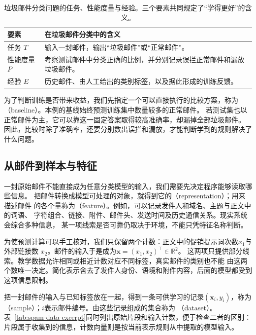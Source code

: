 \begin{table}[htbp]
  \centering
  \small
  \begin{tabularx}{\linewidth}{@{}lX@{}}
    \toprule
    \textbf{要素} & \textbf{在垃圾邮件分类中的含义} \\
    \midrule
    任务 $T$ & 输入一封邮件，输出“垃圾邮件”或“正常邮件”。 \\
    性能度量 $P$ & 考察测试邮件中分类正确的比例，并分别记录误拦正常邮件和漏放垃圾邮件。 \\
    经验 $E$ & 历史邮件、由人工给出的类别标签，以及据此形成的训练反馈。 \\
    \bottomrule
  \end{tabularx}
  \caption{垃圾邮件分类问题的任务、性能度量与经验。三个要素共同规定了“学得更好”的含义。}
  \label{tab:spam-three-elements}
\end{table}

为了判断训练是否带来收益，我们先指定一个可以直接执行的比较方案，称为
（baseline）。本例的基线始终预测训练集中数量较多的正常邮件。
若测试集也以正常邮件为主，它可以靠这一固定答案取得较高准确率，却漏掉全部垃圾邮件。
因此，比较时除了准确率，还要分别数出误拦和漏放，才能判断学到的规则解决了什么问题。

\subsection{从邮件到样本与特征}

一封原始邮件不能直接成为任意分类模型的输入，我们需要先决定程序能够读取哪些信息。
把邮件转换成模型可处理的对象，就得到它的（representation）；用来描述邮件
的各个量称为（feature）。例如，可以记录发件人和域名、主题与正文中的词语、
字符组合、链接、附件、邮件头、发送时间及历史通信关系。现实系统会综合多种信息，
某一项线索是否可靠仍取决于环境，不能只凭特征名称判断。

为使预测计算可以手工核对，我们只保留两个计数：正文中的促销提示词次数$x_1$与外部链接数
$x_2$。邮件的输入于是成为$\bm{x}=(x_1,x_2)^{\top}\in\mathbb{R}^{2}$。
这两项只提供部分线索。教学数据允许相同或相近计数对应不同标签，真实邮件的类别也不能
由这两个数唯一决定。简化表示舍去了发件人身份、语境和附件内容，后面的模型都受到
这项信息限制。

把一封邮件的输入与已知标签放在一起，得到一条可供学习的记录$(\bm{x}_i,y_i)$，称为
（sample）；$i$表示邮件编号。由这些记录组成的集合称为
（dataset）。表~\ref{tab:spam-data-excerpt}同时列出原始片段和输入计数，便于检查二者的区别：
片段属于收集到的信息，计数向量则是按当前表示规则从中提取的模型输入。

